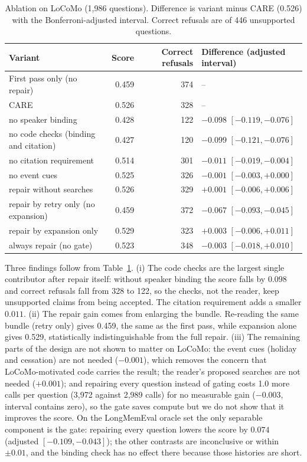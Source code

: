 \documentclass[10pt]{article}
\theoremstyle{plain}
\newcommand{\care}{\textsc{CARE}}
\begin{document}
\begin{table}[t]
\centering
\caption{Ablation on LoCoMo (1,986 questions). Difference is variant minus \care{} (0.526) with the Bonferroni-adjusted
interval. Correct refusals are of 446 unsupported questions.}
\label{tab:ablation}
\small
\begin{tabular}{lrrl}
\toprule
Variant & Score & Correct refusals & Difference (adjusted interval) \\
\midrule
First pass only (no repair) & 0.459 & 374 & -- \\
\care{} & 0.526 & 328 & -- \\
no speaker binding & 0.428 & 122 & $-0.098$ $[-0.119,-0.076]$ \\
no code checks (binding and citation) & 0.427 & 120 & $-0.099$ $[-0.121,-0.076]$ \\
no citation requirement & 0.514 & 301 & $-0.011$ $[-0.019,-0.004]$ \\
no event cues & 0.525 & 326 & $-0.001$ $[-0.003,+0.000]$ \\
repair without searches & 0.526 & 329 & $+0.001$ $[-0.006,+0.006]$ \\
repair by retry only (no expansion) & 0.459 & 372 & $-0.067$ $[-0.093,-0.045]$ \\
repair by expansion only & 0.529 & 323 & $+0.003$ $[-0.006,+0.011]$ \\
always repair (no gate) & 0.523 & 348 & $-0.003$ $[-0.018,+0.010]$ \\
\bottomrule
\end{tabular}
\end{table}

Three findings follow from Table~\ref{tab:ablation}. (i) The code checks are the largest single contributor after repair
itself: without speaker binding the score falls by $0.098$ and correct refusals fall from 328 to 122, so the checks, not
the reader, keep unsupported claims from being accepted. The citation requirement adds a smaller $0.011$. (ii) The
repair gain comes from enlarging the bundle. Re-reading the same bundle (retry only) gives 0.459, the same as the first
pass, while expansion alone gives 0.529, statistically indistinguishable from the full repair. (iii) The remaining parts
of the design are not shown to matter on LoCoMo: the event cues (holiday and cessation) are not needed ($-0.001$), which
removes the concern that LoCoMo-motivated code carries the result; the reader's proposed searches are not needed
($+0.001$); and repairing every question instead of gating costs 1.0 more calls per question (3,972 against 2,989 calls)
for no measurable gain ($-0.003$, interval contains zero), so the gate saves compute but we do not show that it improves
the score. On the LongMemEval oracle set the only separable component is the gate: repairing every question lowers the
score by $0.074$ (adjusted $[-0.109,-0.043]$); the other contrasts are inconclusive or within $\pm0.01$, and the binding
check has no effect there because those histories are short.
\end{document}
